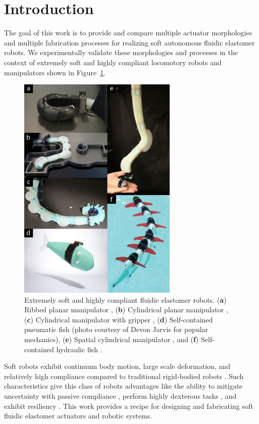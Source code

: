 
\section{Introduction}
\label{sec:Introduction}
The goal of this work is to provide and compare multiple actuator morphologies and multiple fabrication processes for realizing soft autonomous fluidic elastomer robots.
%
We experimentally validate these morphologies and processes in the context of extremely soft and highly compliant locomotory robots and manipulators shown in Figure~\ref{fig:intro_new}.
\begin{figure}[!t]
  \centering
  \includegraphics[width=3in]{figures/introduction/intronew.jpg}
  \caption{Extremely soft and highly compliant fluidic elastomer robots. (\textbf{a}) Ribbed planar manipulator \citep{marchese2014design}, (\textbf{b}) Cylindrical planar manipulator \citep{marchese2014whole}, (\textbf{c}) Cylindrical manipulator with gripper \citep{katzschmann2015autonomous}, (\textbf{d}) Self-contained pneumatic fish \citep{marchese2014autonomous}(photo courtesy of Devon Jarvis for popular mechanics), (\textbf{e}) Spatial cylindrical manipulator \citep{marchese2015design}, and (\textbf{f}) Self-contained hydraulic fish \citep{katzschmann2014hydraulic}. }\label{fig:intro_new}
\end{figure}

Soft robots exhibit continuum body motion, large scale deformation, and relatively high compliance compared to traditional rigid-bodied robots \citep{trivedi2008soft}.
%
Such characteristics give this class of robots advantages like the ability to mitigate uncertainty with passive compliance \citep{mcmahan2006field}, perform highly dexterous tasks \citep{deimel2014novel}, and exhibit resiliency \citep{tolley2014resilient}.
%
This work provides a recipe for designing and fabricating soft fluidic elastomer actuators and robotic systems.

